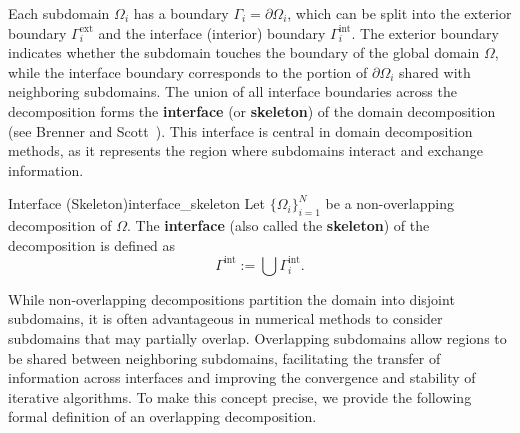 \documentclass[a4paper, 11pt]{article}
\theoremstyle{remark}
\begin{document}
\noindent Each subdomain $\Omega_i$ has a boundary $\Gamma_i = \partial \Omega_i$, which can be split into the exterior boundary $\Gamma_i^{\text{ext}}$ and the interface (interior) boundary $\Gamma_i^{\text{int}}$.  
The exterior boundary indicates whether the subdomain touches the boundary of the global domain $\Omega$, while the interface boundary corresponds to the portion of $\partial \Omega_i$ shared with neighboring subdomains. The union of all interface boundaries across the decomposition forms the \textbf{interface} (or \textbf{skeleton}) of the domain decomposition (see Brenner and Scott~\cite{BrennerScott2008}). This interface is central in domain decomposition methods, as it represents the region where subdomains interact and exchange information.
\begin{definition}{Interface (Skeleton)}{interface_skeleton}
Let $\{\Omega_i\}_{i=1}^N$ be a non-overlapping decomposition of $\Omega$. The \textbf{interface} (also called the \textbf{skeleton}) of the decomposition is defined as
\begin{equation*}
    \Gamma^{\text{int}} := \bigcup\Gamma_{i}^{\text{int}}.
\end{equation*}
\end{definition}
\noindent While non-overlapping decompositions partition the domain into disjoint subdomains, it is often advantageous in numerical methods to consider subdomains that may partially overlap. Overlapping subdomains allow regions to be shared between neighboring subdomains, facilitating the transfer of information across interfaces and improving the convergence and stability of iterative algorithms. To make this concept precise, we provide the following formal definition of an overlapping decomposition.
\end{document}
